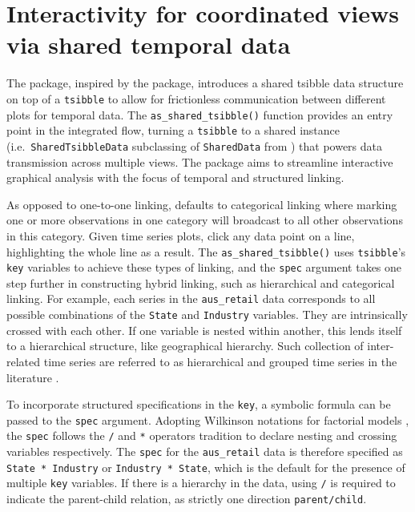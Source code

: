 \hypertarget{interactivity-for-coordinated-views-via-shared-temporal-data}{%
\section{Interactivity for coordinated views via shared temporal
data}\label{interactivity-for-coordinated-views-via-shared-temporal-data}}

The  package, inspired by the 
package, introduces a shared tsibble data structure on top of a
\texttt{tsibble} to allow for frictionless communication between
different plots for temporal data. The \texttt{as\_shared\_tsibble()}
function provides an entry point in the integrated flow, turning a
\texttt{tsibble} to a shared instance (i.e.~\texttt{SharedTsibbleData}
subclassing of \texttt{SharedData} from ) that powers
data transmission across multiple views. The 
package aims to streamline interactive graphical analysis with the focus
of temporal and structured linking.

As opposed to one-to-one linking,  defaults to
categorical linking where marking one or more observations in one
category will broadcast to all other observations in this category.
Given time series plots, click any data point on a line, highlighting
the whole line as a result. The \texttt{as\_shared\_tsibble()} uses
\texttt{tsibble}'s \texttt{key} variables to achieve these types of
linking, and the \texttt{spec} argument takes one step further in
constructing hybrid linking, such as hierarchical and categorical
linking. For example, each series in the \texttt{aus\_retail} data
corresponds to all possible combinations of the \texttt{State} and
\texttt{Industry} variables. They are intrinsically crossed with each
other. If one variable is nested within another, this lends itself to a
hierarchical structure, like geographical hierarchy. Such collection of
inter-related time series are referred to as hierarchical and grouped
time series in the literature \citep{fpp}.

To incorporate structured specifications in the \texttt{key}, a symbolic
formula can be passed to the \texttt{spec} argument. Adopting Wilkinson
notations for factorial models \citep{Wilkinson1973}, the \texttt{spec}
follows the \texttt{/} and \texttt{*} operators tradition to declare
nesting and crossing variables respectively. The \texttt{spec} for the
\texttt{aus\_retail} data is therefore specified as
\texttt{State\ *\ Industry} or \texttt{Industry\ *\ State}, which is the
default for the presence of multiple \texttt{key} variables. If there is
a hierarchy in the data, using \texttt{/} is required to indicate the
parent-child relation, as strictly one direction \texttt{parent/child}.

